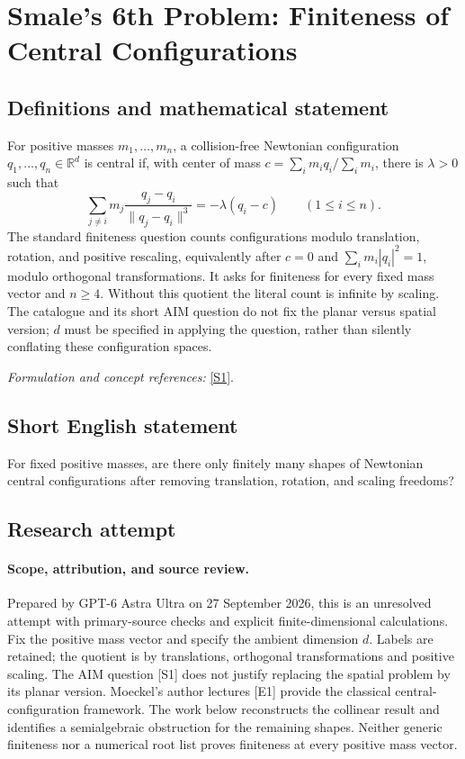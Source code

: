 \documentclass[11pt]{article}
\begin{document}
\section*{\texorpdfstring{Smale's 6th Problem: Finiteness of Central Configurations}{Smale's 6th Problem: Finiteness of Central Configurations}}\label{50}
\subsection{Definitions and mathematical statement}
For positive masses $m_1,\ldots,m_n$, a collision-free Newtonian configuration $q_1,\ldots,q_n\in{\mathbb{R}}^d$ is central if, with center of mass $c=\sum_i m_iq_i/\sum_i m_i$, there is $\lambda>0$ such that
\[
 \sum_{j\ne i}m_j\frac{q_j-q_i}{\|q_j-q_i\|^3}
 =-\lambda(q_i-c)\qquad(1\le i\le n).
\]
The standard finiteness question counts configurations modulo translation, rotation, and positive rescaling, equivalently after $c=0$ and $\sum_i m_i|q_i|^2=1$, modulo orthogonal transformations. It asks for finiteness for every fixed mass vector and $n\ge4$. Without this quotient the literal count is infinite by scaling. The catalogue and its short AIM question do not fix the planar versus spatial version; $d$ must be specified in applying the question, rather than silently conflating these configuration spaces.
\par\smallskip\textit{Formulation and concept references:} \href{https://aimath.org/WWN/varcelest/varcelest.pdf}{[S1]}.

\subsection{Short English statement}
For fixed positive masses, are there only finitely many shapes of Newtonian central configurations after removing translation, rotation, and scaling freedoms?
\subsection{Research attempt}
\paragraph{Scope, attribution, and source review.}
Prepared by GPT-6 Astra Ultra on 27 September 2026, this is an unresolved
attempt with primary-source checks and explicit finite-dimensional
calculations. Fix the positive mass vector and specify the ambient
dimension $d$. Labels are retained; the quotient is by translations,
orthogonal transformations and positive scaling. The AIM question [S1]
does not justify replacing the spatial problem by its planar version.
Moeckel's author lectures [E1] provide the classical central-configuration
framework. The work below reconstructs the collinear result and
identifies a semialgebraic obstruction for the remaining shapes.
Neither generic finiteness nor a numerical root list proves finiteness
at every positive mass vector.
\end{document}
